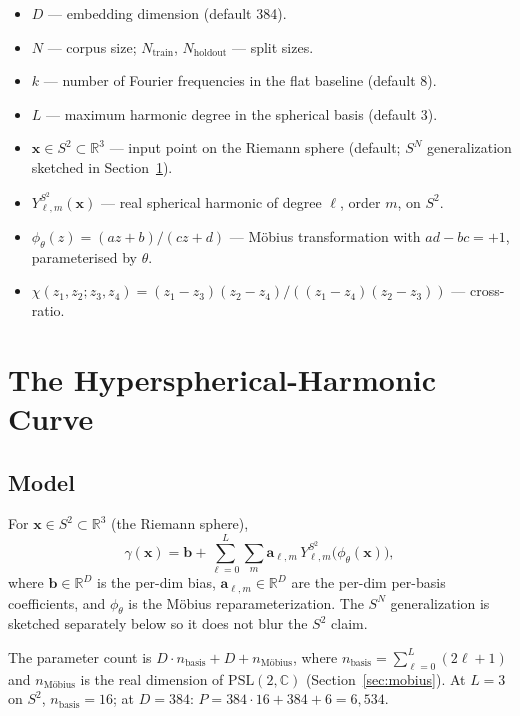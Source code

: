 \documentclass[11pt,a4paper]{article}
\begin{document}
\begin{itemize}
\item $D$ --- embedding dimension (default 384).
\item $N$ --- corpus size; $N_{\mathrm{train}}$, $N_{\mathrm{holdout}}$ --- split sizes.
\item $k$ --- number of Fourier frequencies in the flat baseline (default 8).
\item $L$ --- maximum harmonic degree in the spherical basis (default 3).
\item $\mathbf{x} \in S^2 \subset \mathbb{R}^3$ --- input point on the Riemann sphere (default; $S^N$ generalization sketched in Section~\ref{sec:variant}).
\item $Y^{S^2}_{\ell,m}(\mathbf{x})$ --- real spherical harmonic of degree $\ell$, order $m$, on $S^2$.
\item $\phi_\theta(z) = (az+b)/(cz+d)$ --- Möbius transformation with $ad-bc=+1$, parameterised by $\theta$.
\item $\chi(z_1,z_2;z_3,z_4) = (z_1-z_3)(z_2-z_4)/((z_1-z_4)(z_2-z_3))$ --- cross-ratio.
\end{itemize}

\section{The Hyperspherical-Harmonic Curve}
\label{sec:variant}

\subsection{Model}

For $\mathbf{x} \in S^2 \subset \mathbb{R}^3$ (the Riemann sphere),
\begin{equation}
\gamma(\mathbf{x}) = \mathbf{b} + \sum_{\ell=0}^{L} \sum_{m} \mathbf{a}_{\ell,m}\, Y^{S^2}_{\ell,m}\!\big(\phi_\theta(\mathbf{x})\big),
\label{eq:hyperspherical}
\end{equation}
where $\mathbf{b} \in \mathbb{R}^D$ is the per-dim bias, $\mathbf{a}_{\ell,m} \in \mathbb{R}^D$ are the per-dim per-basis coefficients, and $\phi_\theta$ is the M\"obius reparameterization. The $S^N$ generalization is sketched separately below so it does not blur the $S^2$ claim.

The parameter count is $D \cdot n_{\mathrm{basis}} + D + n_{\mathrm{Möbius}}$, where $n_{\mathrm{basis}} = \sum_{\ell=0}^{L}(2\ell+1)$ and $n_{\mathrm{Möbius}}$ is the real dimension of $\mathrm{PSL}(2,\mathbb{C})$ (Section~\ref{sec:mobius}). At $L=3$ on $S^2$, $n_{\mathrm{basis}}=16$; at $D=384$: $P = 384 \cdot 16 + 384 + 6 = 6{,}534$.
\end{document}
